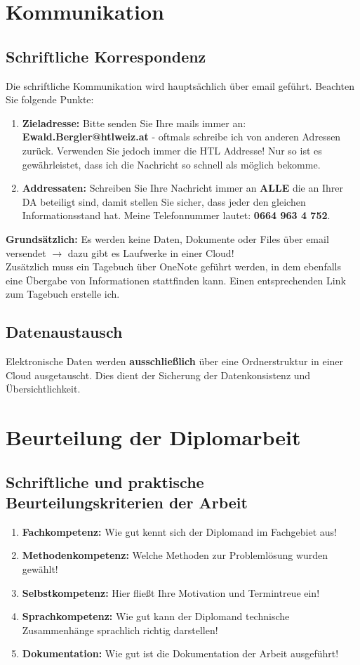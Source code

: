 \documentclass[a4paper, 12pt, xcolor=dvipsnames]{scrartcl}		%
\begin{document}


\section{Kommunikation}
\subsection{Schriftliche Korrespondenz}
Die schriftliche Kommunikation wird hauptsächlich über email geführt. Beachten Sie folgende Punkte:
\begin{enumerate}
\item\textbf{Zieladresse:} Bitte senden Sie Ihre mails immer an: \textbf{Ewald.Bergler@htlweiz.at} - oftmals schreibe ich von anderen Adressen zurück. Verwenden Sie jedoch immer die HTL Addresse! Nur so ist es gewährleistet, dass ich die Nachricht so schnell als möglich bekomme.
\item\textbf{Addressaten:} Schreiben Sie Ihre Nachricht immer an \textbf{ALLE} die an Ihrer DA beteiligt sind, damit stellen Sie sicher, dass jeder den gleichen Informationsstand hat. Meine Telefonnummer lautet: \textbf{0664 963 4 752}.
\end{enumerate}
\textbf{Grundsätzlich:} Es werden keine Daten, Dokumente oder Files über email versendet $\to$ dazu gibt es Laufwerke in einer Cloud!\\
Zusätzlich muss ein Tagebuch über OneNote geführt werden, in dem ebenfalls eine Übergabe von Informationen stattfinden kann. Einen entsprechenden Link zum Tagebuch erstelle ich. 

\subsection{Datenaustausch}
Elektronische Daten werden \textbf{ausschließlich} über eine Ordnerstruktur in einer Cloud ausgetauscht. Dies dient der Sicherung der Datenkonsistenz und Übersichtlichkeit. 



\section{Beurteilung der Diplomarbeit}
\subsection{Schriftliche und praktische Beurteilungskriterien der Arbeit}
\begin{enumerate}
\item\textbf{Fachkompetenz:} Wie gut kennt sich der Diplomand im Fachgebiet aus!
\item\textbf{Methodenkompetenz:} Welche Methoden zur Problemlösung wurden gewählt!
\item\textbf{Selbstkompetenz:} Hier fließt Ihre Motivation und Termintreue ein!
\item\textbf{Sprachkompetenz:} Wie gut kann der Diplomand technische Zusammenhänge sprachlich richtig darstellen!
\item\textbf{Dokumentation:} Wie gut ist die Dokumentation der Arbeit ausgeführt!
\end{enumerate}
\end{document}
